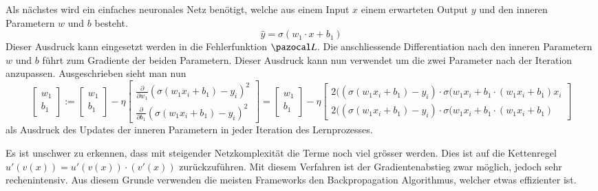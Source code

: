 Als nächstes wird ein einfaches neuronales Netz benötigt, welche aus einem Input $x$ einem erwarteten Output $y$ und den inneren Parametern $w$ und $b$ besteht.
\begin{equation}
	\hat{y} = \sigma \left( w_1 \cdot x + b_1 \right)
\end{equation}
Dieser Ausdruck kann eingesetzt werden in die Fehlerfunktion $\Lb$. Die anschliessende Differentiation nach den inneren Parametern $w$ und $b$ führt zum Gradiente der beiden Parametern. Dieser Ausdruck kann nun verwendet um die zwei Parameter nach der Iteration anzupassen. Ausgeschrieben sieht man nun
\begin{equation}
\begin{bmatrix}w_{1}\\b_{1}\end{bmatrix}:={\begin{bmatrix}w_{1}\\b_{1}\end{bmatrix}}-\eta {\begin{bmatrix}
{\frac {\partial }{\partial w_{1}}}(\sigma(w_{1}x_{i}+b_{1})-y_{i})^{2}\\
{\frac {\partial }{\partial b_{1}}}(\sigma(w_{1}x_{i}+b_{1})-y_{i})^{2}\end{bmatrix}}=
{\begin{bmatrix}w_{1}\\b_{1}\end{bmatrix}}-\eta {\begin{bmatrix}2((\sigma(w_{1}x_{i}+b_{1}) - y_i) \cdot \sigma(w_{1}x_{i}+b_{1} \cdot (w_{1}x_{i}+b_{1}) x_{i} \\2((\sigma(w_{1}x_{i}+b_{1}) - y_i) \cdot \sigma(w_{1}x_{i}+b_{1} \cdot (w_{1}x_{i}+b_{1}) \end{bmatrix}}
\end{equation}
als Ausdruck des Updates der inneren Parametern in jeder Iteration des Lernprozesses.

Es ist unschwer zu erkennen, dass mit steigender Netzkomplexität die Terme noch viel grösser werden. Dies ist auf die Kettenregel $u'(v(x)) = u'(v(x)) \cdot (v'(x))$ zurückzuführen. Mit diesem Verfahren ist der Gradientenabstieg zwar möglich, jedoch sehr rechenintensiv. Aus diesem Grunde verwenden die meisten Frameworks den Backpropagation Algorithmus, welcher etwas effizienter ist.